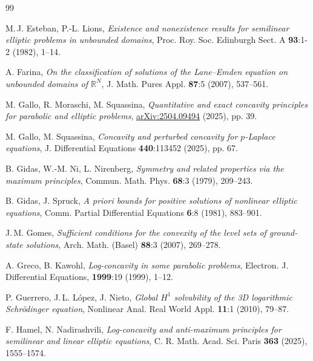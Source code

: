 \documentclass[12pt]{amsart}
\numberwithin{equation}{section}
\theoremstyle{plain}
\theoremstyle{plain}
\theoremstyle{plain}
\theoremstyle{definition}
\newcommand{\R}{{\mathbb R}}
\begin{document}
\begin{thebibliography}{99}

M.$\,$J. Esteban, P.-L. Lions,
\emph{Existence and nonexistence results for semilinear elliptic problems in unbounded domains},
Proc. Roy. Soc. Edinburgh Sect. A \textbf{93}:1-2 (1982), 1--14.


A. Farina,
\emph{On the classification of solutions of the Lane–Emden equation on unbounded domains of $\R^N$},
J. Math. Pures Appl. \textbf{87}:5 (2007), 537--561.


M. Gallo, R. Moraschi, M. Squassina,
\emph{Quantitative and exact concavity principles for parabolic and elliptic problems},
\href{https://doi.org/10.48550/arXiv.2504.09494}{arXiv:2504.09494} (2025), pp. 39.

M. Gallo, M. Squassina, 
\emph{Concavity and perturbed concavity for $p$-Laplace equations},
J. Differential Equations \textbf{440}:113452 (2025), pp. 67.

B. Gidas, W.-M. Ni, L. Nirenberg,
\emph{Symmetry and related properties via the maximum principles},
Commun. Math. Phys. \textbf{68}:3 (1979), 209--243.

B. Gidas, J. Spruck,
 \emph{A priori bounds for positive solutions of nonlinear elliptic equations}, 
Comm. Partial Differential Equations \textbf{6}:8 (1981), 883--901.

J.$\,$M. Gomes,
\emph{Sufficient conditions for the convexity of the level sets of ground-state solutions}, 
Arch. Math. (Basel) \textbf{88}:3 (2007), 269--278.

A. Greco, B. Kawohl,
\emph{Log-concavity in some parabolic problems},
Electron. J. Differential Equations, \textbf{1999}:19 (1999), 1--12.

P. Guerrero, J.$\,$L. López, J. Nieto,
\emph{Global $H^1$ solvability of the 3D logarithmic Schrödinger equation},
Nonlinear Anal. Real World Appl. \textbf{11}:1 (2010), 79--87.

F. Hamel, N. Nadirashvili,
\emph{Log-concavity and anti-maximum principles for semilinear and linear elliptic equations}, 
C. R. Math. Acad. Sci. Paris %
\textbf{363} (2025), 1555--1574.


\end{thebibliography}
\end{document}
